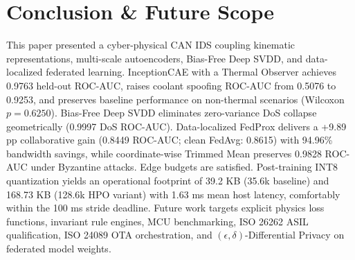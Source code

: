 \documentclass[conference]{IEEEtran}
\begin{document}
\section{Conclusion \& Future Scope}
This paper presented a cyber-physical CAN IDS coupling kinematic representations, multi-scale autoencoders, Bias-Free Deep SVDD, and data-localized federated learning. InceptionCAE with a Thermal Observer achieves 0.9763 held-out ROC-AUC, raises coolant spoofing ROC-AUC from 0.5076 to 0.9253, and preserves baseline performance on non-thermal scenarios (Wilcoxon $p=0.6250$). Bias-Free Deep SVDD eliminates zero-variance DoS collapse geometrically (0.9997 DoS ROC-AUC). Data-localized FedProx delivers a +9.89 pp collaborative gain (0.8449 ROC-AUC; clean FedAvg: 0.8615) with 94.96\% bandwidth savings, while coordinate-wise Trimmed Mean preserves 0.9828 ROC-AUC under Byzantine attacks. Edge budgets are satisfied. Post-training INT8 quantization yields an operational footprint of 39.2 KB (35.6k baseline) and 168.73 KB (128.6k HPO variant) with 1.63 ms mean host latency, comfortably within the 100 ms stride deadline. Future work targets explicit physics loss functions, invariant rule engines, MCU benchmarking, ISO 26262 ASIL qualification, ISO 24089 OTA orchestration, and $(\epsilon, \delta)$-Differential Privacy on federated model weights.
\end{document}
